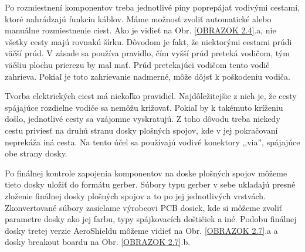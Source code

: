 Po rozmiestnení komponentov treba jednotlivé piny poprepájať vodivými cestami, ktoré nahrádzajú funkciu káblov. Máme možnosť zvoliť automatické alebo manuálne rozmiestnenie ciest. Ako je vidieť na Obr. \ref{OBRAZOK 2.4}.a, nie všetky cesty majú rovnakú šírku. Dôvodom je fakt, že niektorými cestami prúdi väčší prúd. V zásade sa používa pravidlo, čím vyšší prúd preteká vodičom, tým väčšiu plochu prierezu by mal mať. Prúd pretekajúci vodičom tento vodič zahrieva. Pokiaľ je toto zahrievanie nadmerné, môže dôjsť k poškodeniu vodiča.  

Tvorba elektrických ciest má niekoľko pravidiel. Najdôležitejšie z nich je, že cesty spájajúce rozdielne vodiče sa nemôžu križovať. Pokiaľ by k takémuto kríženiu došlo, jednotlivé cesty sa vzájomne vyskratujú. Z toho dôvodu treba niekedy cestu priviesť na druhú stranu dosky plošných spojov, kde v jej pokračovaní neprekáža iná cesta. Na tento účel sa používajú vodivé konektory ,,via'', spájajúce obe strany dosky.

Po finálnej kontrole zapojenia komponentov na doske plošných spojov môžeme tieto dosky uložiť do formátu gerber. Súbory typu gerber v sebe ukladajú presné zloženie finálnej dosky plošných spojov a to po jej jednotlivých vrstvách. Zkonvertované súbory zasielame výrobcovi PCB dosiek, kde si môžeme zvoliť parametre dosky ako jej farbu, typy spájkovacích doštičiek a iné. Podobu finálnej dosky tretej verzie AeroShieldu môžeme vidieť na Obr. \ref{OBRAZOK 2.7}.a a dosky breakout boardu na Obr. \ref{OBRAZOK 2.7}.b.

